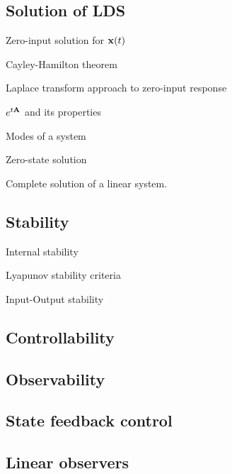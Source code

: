 \documentclass[fontsize=9pt]{scrbook}
\def\mf{\ensuremath\mathbf}
\begin{document}
\begin{multicols}{2}

\subsection*{Solution of LDS}
\begin{enumerate*}
    \item Zero-input solution for $\mf{x}(t)$
    \item Cayley-Hamilton theorem
    \item Laplace transform approach to zero-input response
    \item $e^{t\mf{A}}$ and its properties
    \item Modes of a system
    \item Zero-state solution
    \item Complete solution of a linear system.
\end{enumerate*}

\subsection*{Stability}
\begin{enumerate*}
    \item Internal stability
    \item Lyapunov stability criteria
    \item Input-Output stability
\end{enumerate*}

\subsection*{Controllability}

\subsection*{Observability}

\subsection*{State feedback control}

\subsection*{Linear observers}

\vfill\clearpage

\end{multicols}
\end{document}
